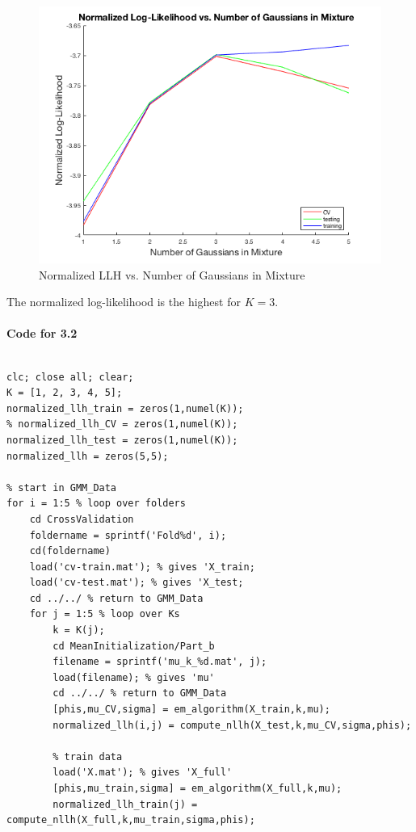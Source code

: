 \documentclass[english]{article}
\begin{document}
\begin{enumerate}
    \begin{figure}[H]
    \centering
    \includegraphics[scale = 0.5]{3_2}
    \caption{Normalized LLH vs. Number of Gaussians in Mixture}
    \label{fig:3_2}
    \end{figure}
    The normalized log-likelihood is the highest for $K = 3$. \\ \\
    \noindent\textbf{Code for 3.2}
    \color{black}
    \begin{verbatim}

clc; close all; clear;
K = [1, 2, 3, 4, 5];
normalized_llh_train = zeros(1,numel(K));
% normalized_llh_CV = zeros(1,numel(K));
normalized_llh_test = zeros(1,numel(K));
normalized_llh = zeros(5,5);

% start in GMM_Data
for i = 1:5 % loop over folders
    cd CrossValidation
    foldername = sprintf('Fold%d', i);
    cd(foldername)
    load('cv-train.mat'); % gives 'X_train;
    load('cv-test.mat'); % gives 'X_test;
    cd ../../ % return to GMM_Data
    for j = 1:5 % loop over Ks
        k = K(j);
        cd MeanInitialization/Part_b
        filename = sprintf('mu_k_%d.mat', j);
        load(filename); % gives 'mu'
        cd ../../ % return to GMM_Data
        [phis,mu_CV,sigma] = em_algorithm(X_train,k,mu);
        normalized_llh(i,j) = compute_nllh(X_test,k,mu_CV,sigma,phis);
        
        % train data
        load('X.mat'); % gives 'X_full'
        [phis,mu_train,sigma] = em_algorithm(X_full,k,mu);
        normalized_llh_train(j) = compute_nllh(X_full,k,mu_train,sigma,phis);
        

\end{verbatim}
\end{enumerate}
\end{document}
